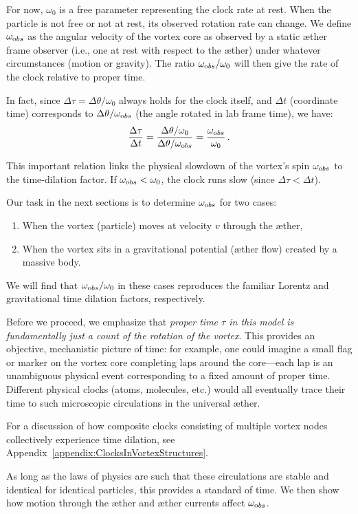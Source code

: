 For now, $\omega_0$ is a free parameter representing the clock rate at rest. When the particle is not free or not at rest, its observed rotation rate can change. We define $\omega_{\textrm obs}$ as the angular velocity of the vortex core as observed by a static æther frame observer (i.e., one at rest with respect to the æther) under whatever circumstances (motion or gravity). The ratio $\omega_{\textrm obs}/\omega_0$ will then give the rate of the clock relative to proper time.

In fact, since $\Delta \tau = \Delta \theta / \omega_0$ always holds for the clock itself, and $\Delta t$ (coordinate time) corresponds to $\Delta \theta / \omega_{\textrm obs}$ (the angle rotated in lab frame time), we have:
\begin{equation}
\frac{\Delta \tau}{\Delta t} = \frac{\Delta \theta / \omega_0}{\Delta \theta / \omega_{\textrm obs}} = \frac{\omega_{\textrm obs}}{\omega_0} \,.
\end{equation}

This important relation links the physical slowdown of the vortex's spin $\omega_{\textrm obs}$ to the time-dilation factor. If $\omega_{\textrm obs} < \omega_0$, the clock runs slow (since $\Delta \tau < \Delta t$).

Our task in the next sections is to determine $\omega_{\textrm obs}$ for two cases:
\begin{enumerate}
    \item When the vortex (particle) moves at velocity $v$ through the æther,
    \item When the vortex sits in a gravitational potential (æther flow) created by a massive body.
\end{enumerate}
We will find that $\omega_{\textrm obs}/\omega_0$ in these cases reproduces the familiar Lorentz and gravitational time dilation factors, respectively.

Before we proceed, we emphasize that \emph{proper time $\tau$ in this model is fundamentally just a count of the rotation of the vortex}. This provides an objective, mechanistic picture of time: for example, one could imagine a small flag or marker on the vortex core completing laps around the core—each lap is an unambiguous physical event corresponding to a fixed amount of proper time. Different physical clocks (atoms, molecules, etc.) would all eventually trace their time to such microscopic circulations in the universal æther.

For a discussion of how composite clocks consisting of multiple vortex nodes collectively experience time dilation, see Appendix~\ref{appendix:ClocksInVortexStructures}.

As long as the laws of physics are such that these circulations are stable and identical for identical particles, this provides a standard of time. We then show how motion through the æther and æther currents affect $\omega_{\textrm obs}$.